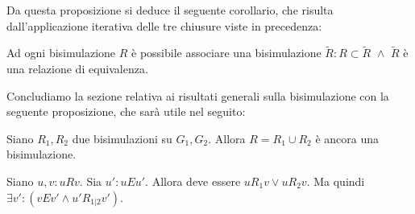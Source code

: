 Da questa proposizione si deduce il seguente corollario, che risulta dall'applicazione iterativa delle tre chiusure viste in precedenza:
\begin{corollary}
    Ad ogni bisimulazione $R$ è possibile associare una bisimulazione $\widetilde{R} : R \subset \widetilde{R} \,\,\land\,\, \widetilde{R}$ è una relazione di equivalenza.
    \label{cor:bisimulation_eqrel}
\end{corollary}
Concludiamo la sezione relativa ai risultati generali sulla bisimulazione con la seguente proposizione, che sarà utile nel seguito:
\begin{proposition}
    Siano $R_1, R_2$ due bisimulazioni su $G_1, G_2$. Allora $R = R_1 \cup R_2$ è ancora una bisimulazione.
    \label{obs:bisimulation_union}
\end{proposition}
\begin{proof2}
    Siano $u,v : u R v$. Sia $u' : u E u'$. Allora deve essere $u R_1 v \lor u R_2 v$. Ma quindi $\exists v' : (v E v' \land u' R_{1|2} v')$.
\end{proof2}

